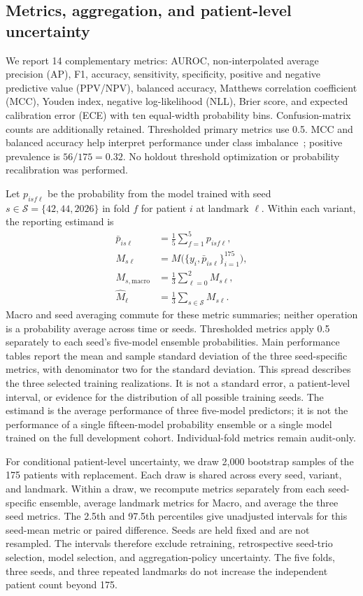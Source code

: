 \subsection{Metrics, aggregation, and patient-level uncertainty}
We report 14 complementary metrics: AUROC, non-interpolated average precision (AP), F1, accuracy, sensitivity, specificity, positive and negative predictive value (PPV/NPV), balanced accuracy, Matthews correlation coefficient (MCC), Youden index, negative log-likelihood (NLL), Brier score, and expected calibration error (ECE) with ten equal-width probability bins. Confusion-matrix counts are additionally retained. Thresholded primary metrics use 0.5. MCC and balanced accuracy help interpret performance under class imbalance~\citep{chicco2020mcc}; positive prevalence is $56/175=0.32$. No holdout threshold optimization or probability recalibration was performed.

Let $p_{isf\ell}$ be the probability from the model trained with seed $s\in\mathcal{S}=\{42,44,2026\}$ in fold $f$ for patient $i$ at landmark $\ell$. Within each variant, the reporting estimand is
\begin{equation}
\begin{aligned}
 \bar p_{is\ell}&=\frac{1}{5}\sum_{f=1}^{5}p_{isf\ell},\\
 M_{s\ell}&=M\bigl(\{y_i,\bar p_{is\ell}\}_{i=1}^{175}\bigr),\\
 M_{s,\mathrm{macro}}&=\frac{1}{3}\sum_{\ell=0}^{2}M_{s\ell},\\
 \widehat M_\ell&=\frac{1}{3}\sum_{s\in\mathcal{S}}M_{s\ell}.
\end{aligned}
\end{equation}
Macro and seed averaging commute for these metric summaries; neither operation is a probability average across time or seeds. Thresholded metrics apply 0.5 separately to each seed's five-model ensemble probabilities. Main performance tables report the mean and sample standard deviation of the three seed-specific metrics, with denominator two for the standard deviation. This spread describes the three selected training realizations. It is not a standard error, a patient-level interval, or evidence for the distribution of all possible training seeds. The estimand is the average performance of three five-model predictors; it is not the performance of a single fifteen-model probability ensemble or a single model trained on the full development cohort. Individual-fold metrics remain audit-only.

For conditional patient-level uncertainty, we draw 2,000 bootstrap samples of the 175 patients with replacement. Each draw is shared across every seed, variant, and landmark. Within a draw, we recompute metrics separately from each seed-specific ensemble, average landmark metrics for Macro, and average the three seed metrics. The 2.5th and 97.5th percentiles give unadjusted intervals for this seed-mean metric or paired difference. Seeds are held fixed and are not resampled. The intervals therefore exclude retraining, retrospective seed-trio selection, model selection, and aggregation-policy uncertainty. The five folds, three seeds, and three repeated landmarks do not increase the independent patient count beyond 175.

